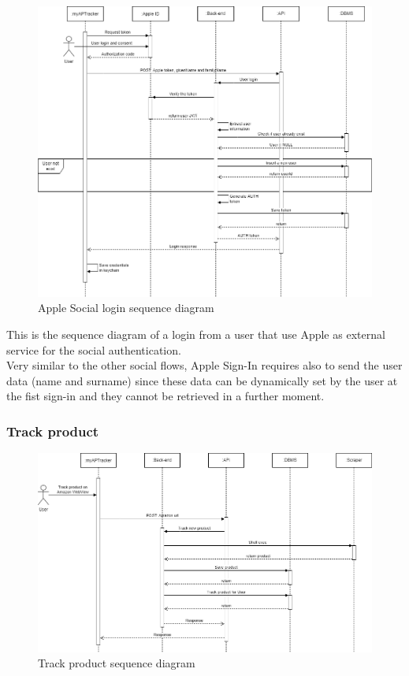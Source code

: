 \begin{figure}[h!]
        \centering
        \includegraphics[scale=0.40]{images/runtime_view/social_login_apple.png}
        \caption{Apple Social login sequence diagram}
        \label{fig:apple_social_login_sequence_diagram}
\end{figure}
\FloatBarrier

This is the sequence diagram of a login from a user that use Apple as external service for the social authentication.\\
Very similar to the other social flows, Apple Sign-In requires also to send the user data (name and surname) since these data can be dynamically set by the user at the fist sign-in and they cannot be retrieved in a further moment. 

\newpage

\subsubsection{Track product}

\begin{figure}[h!]
        \centering
        \includegraphics[scale=0.40]{images/runtime_view/track_product.png}
        \caption{Track product sequence diagram}
        \label{fig:track_product_sequence_diagram}
\end{figure}
\FloatBarrier

